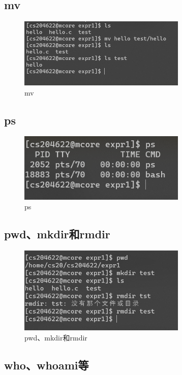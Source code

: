 \documentclass[a4paper,twoside]{article}
\begin{document}
\begin{spacing}{1.2}
\subsection{mv}

\begin{figure}[H]
	\centering
	\includegraphics[width=8.0cm]{mv.png}
	\caption{mv}
\end{figure}

\subsection{ps}

\begin{figure}[H]
	\centering
	\includegraphics[width=8.0cm]{ps.png}
	\caption{ps}
\end{figure}

\subsection{pwd、mkdir和rmdir}

\begin{figure}[H]
	\centering
	\includegraphics[width=8.0cm]{pwdmkdir.png}
	\caption{pwd、mkdir和rmdir}
\end{figure}

\subsection{who、whoami等}


\end{spacing}
\end{document}
